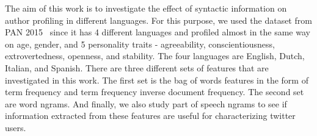 \documentclass[a4paper]{llncs}
\begin{document}
The aim of this work is to investigate the effect of syntactic information on author profiling in different languages. For this purpose, we used the dataset from PAN 2015~\cite{rangel:2015} since it has 4 different languages and profiled almost in the same way on age, gender, and 5 personality traits - agreeability, conscientiousness, extrovertedness, openness, and stability. The four languages are English, Dutch, Italian, and Spanish. There are three different sets of features that are investigated in this work. The first set is the bag of words features in the form of term frequency and term frequency inverse document frequency. The second set are word ngrams. And finally, we also study part of speech ngrams to see if information extracted from these features are useful for characterizing twitter users.

%
%
%
\end{document}
